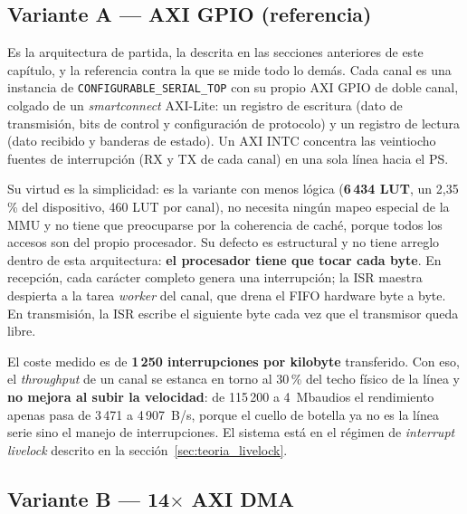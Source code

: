 \subsection{Variante A --- AXI GPIO (referencia)}

Es la arquitectura de partida, la descrita en las secciones anteriores de este capítulo, y la
referencia contra la que se mide todo lo demás. Cada canal es una instancia de
\texttt{CONFIGURABLE\_SERIAL\_TOP} con su propio AXI GPIO de doble canal, colgado de un
\textit{smartconnect} AXI-Lite: un registro de escritura (dato de transmisión, bits de control y
configuración de protocolo) y un registro de lectura (dato recibido y banderas de estado). Un AXI
INTC concentra las veintiocho fuentes de interrupción (RX y TX de cada canal) en una sola línea
hacia el PS.

Su virtud es la simplicidad: es la variante con menos lógica (\textbf{6\,434 LUT}, un
2,35\,\% del dispositivo, 460 LUT por canal), no necesita ningún mapeo especial
de la MMU y no tiene que preocuparse por la coherencia de caché, porque todos los accesos son
del propio procesador. Su defecto es estructural y no tiene arreglo dentro de esta
arquitectura: \textbf{el procesador tiene que tocar cada byte}. En recepción, cada carácter
completo genera una interrupción; la ISR maestra despierta a la tarea \textit{worker} del canal,
que drena el FIFO hardware byte a byte. En transmisión, la ISR escribe el siguiente byte cada
vez que el transmisor queda libre.

El coste medido es de \textbf{1\,250 interrupciones por kilobyte} transferido. Con eso, el
\textit{throughput} de un canal se estanca en torno al 30\,\% del techo físico de la línea y
\textbf{no mejora al subir la velocidad}: de 115\,200 a 4~Mbaudios
el rendimiento apenas pasa de 3\,471 a 4\,907~B/s, porque el cuello de botella ya no es la línea
serie sino el manejo de interrupciones. El sistema está en el régimen de \textit{interrupt
livelock} descrito en la sección~\ref{sec:teoria_livelock}.

\subsection{Variante B --- 14$\times$ AXI DMA}

